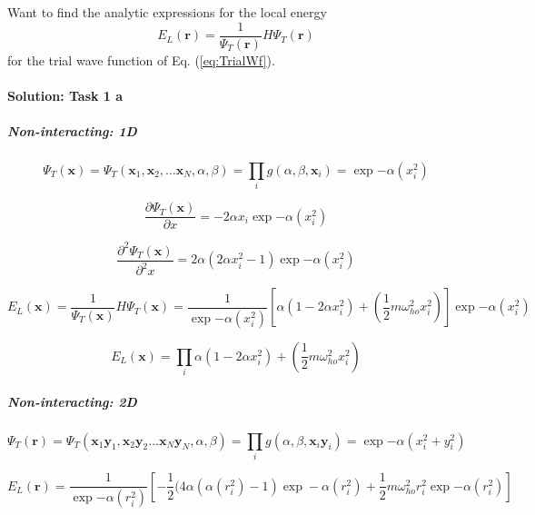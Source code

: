 \documentclass[oneside,onecolumn,9pt]{article}
\begin{document}
 Want to find the analytic expressions for the local energy
\begin{equation}
    E_L(\mathbf{r})=\frac{1}{\Psi_T(\mathbf{r})}H\Psi_T(\mathbf{r})
    \label{eq:LocalE}
\end{equation}
 for the trial wave function of Eq. (\ref{eq:TrialWf}). 

\paragraph{Solution: Task 1 a}
\subparagraph{Non-interacting: 1D}

\begin{equation}
 \Psi_T(\mathbf{x})=\Psi_T(\mathbf{x}_1, \mathbf{x}_2, \dots \mathbf{x}_N,\alpha,\beta)=\prod_i g(\alpha,\beta,\mathbf{x}_i)= \exp{-\alpha(x_i^2)}
 \label{eq:TrialWfN1D}
 \end{equation}
 
 \begin{equation}
\frac{\partial \Psi_T(\mathbf{x})}{\partial x}= -2 \alpha x_i \exp{-\alpha(x_i^2)}
 \label{eq:dTrialWfN1D}
 \end{equation}
 
  \begin{equation}
\frac{\partial^2 \Psi_T(\mathbf{x})}{\partial^2 x}= 2\alpha (2\alpha x_i^2-1) \exp{-\alpha(x_i^2)}
 \label{eq:ddTrialWfN1D}
 \end{equation}
 
 \begin{equation}
    E_L(\mathbf{x})=\frac{1}{\Psi_T(\mathbf{x})}H\Psi_T(\mathbf{x}) = \frac{1}{\exp{-\alpha(x_i^2)}} 
   [ \alpha(1-2\alpha x_i^2) + ( \frac{1}{2}m\omega_{ho}^2x_i^2)] \exp{-\alpha(x_i^2)} 
\label{eq:LocalEN1D}
\end{equation}

 \begin{equation}
    E_L(\mathbf{x})= \prod_i  \alpha(1-2\alpha x_i^2) + ( \frac{1}{2}m\omega_{ho}^2x_i^2)
\label{eq:LocalEN1D2}
\end{equation}
 
\subparagraph{Non-interacting: 2D}

\begin{equation}
 \Psi_T(\mathbf{r})=\Psi_T(\mathbf{x}_1\mathbf{y}_1, \mathbf{x}_2\mathbf{y}_2 \dots \mathbf{x}_N\mathbf{y}_N,\alpha,\beta)=\prod_i g(\alpha,\beta,\mathbf{x}_i\mathbf{y}_i) = \exp{-\alpha(x_i^2+y_i^2)}
 \label{eq:TrialWfN2D}
 \end{equation}

 \begin{equation}
    E_L(\mathbf{r})
    = \frac{1}{\exp{-\alpha(r_i^2)}} 
    [ -\frac{1}{2} (4 \alpha (\alpha (r_i^2) -1) \exp -\alpha (r_i^2) + \frac{1}{2}m\omega_{ho}^2r_i^2 \exp{-\alpha(r_i^2)}] 
\label{eq:LocalEN2D}
\end{equation}
\end{document}
